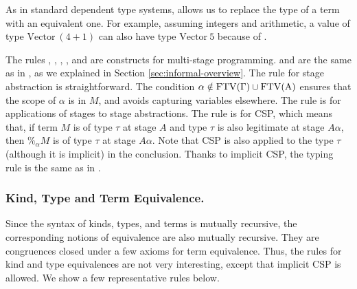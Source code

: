 
As in standard dependent type systems, \TConv{} allows us to replace the type
of a term with an equivalent one. For example, assuming integers and
arithmetic, a value of type $\textrm{Vector}\ (4+1)$ can also have type
$\textrm{Vector}\ 5$ because of \TConv{}.


The rules \TTB, \TTBL, \TGen, \TIns, and \TCsp{} are constructs for multi-stage
programming. \TTB{} and \TTBL{} are the same as in \LTP, as we explained in
Section \ref{sec:informal-overview}. The rule \TGen{} for stage abstraction is
straightforward. The condition $\alpha\notin\rm{FTV}(\Gamma)\cup\rm{FTV}(A)$
ensures that the scope of $\alpha$ is in $M$, and avoids capturing variables
elsewhere. The rule \TIns{} is for applications of stages to stage
abstractions. The rule \TCsp{} is for CSP, which means that, if term $M$ is of
type $\tau$ at stage $A$ and type \( \tau \) is also legitimate at stage \(
A\alpha \), then $\%_\alpha M$ is of type $\tau$ at stage $A\alpha$. Note that
CSP is also applied to the type \(\tau\) (although it is implicit) in the
conclusion. Thanks to implicit CSP, the typing rule is the same as in \LTP.

\subsubsection{Kind, Type and Term Equivalence.}

Since the syntax of kinds, types, and terms is mutually recursive, the
corresponding notions of equivalence are also mutually recursive.  They are
congruences closed under a few axioms for term equivalence.  Thus, the rules
for kind and type equivalences are not very interesting, except that implicit
CSP is allowed.  We show a few representative rules below.

\begin{center}
        \hfil
        \\[2mm]
\end{center}


